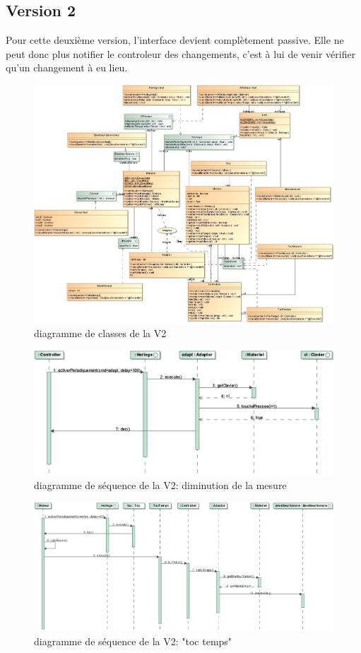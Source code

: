 \documentclass{article}
\begin{document}
\subsection{Version 2}
Pour cette deuxième version, l'interface devient complètement passive. Elle ne peut donc plus notifier le controleur des changements, c'est à lui de venir vérifier qu'un changement à eu lieu.
\begin{figure}[h]
   \caption{diagramme de classes de la V2}
   \includegraphics{class_diagram_v2}
\end{figure}
\begin{figure}[h]
   \caption{diagramme de séquence de la V2: diminution de la mesure}
   \includegraphics{seq_diagram_v2}
\end{figure}
\begin{figure}[h]
   \caption{diagramme de séquence de la V2: "toc temps"}
   \includegraphics{seq_diagram_v2_2}
\end{figure}
\end{document}
